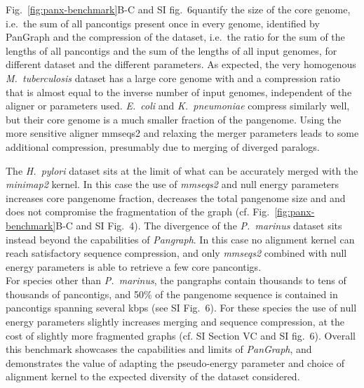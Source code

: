 \documentclass[aps,rmp,preprint,superscriptaddress,10pt,linenumbers]{revtex4-1}
\newcommand{\SIdataBenchmark}{V}
\newcommand{\SIfigBenchmark}{6}
\begin{document}
Fig.~\ref{fig:panx-benchmark}B-C and SI fig.~\SIfigBenchmark quantify the size of the core genome, i.e.~the sum of all pancontigs present once in every genome, identified by PanGraph and the compression of the dataset, i.e.~the ratio for the sum of the lengths of all pancontigs and the sum of the lengths of all input genomes, for different dataset and the different parameters.
As expected, the very homogenous \textit{M.~tuberculosis} dataset has a large core genome with and a compression ratio that is almost equal to the inverse number of input genomes, independent of the aligner or parameters used.
\textit{E.~coli} and \textit{K.~pneumoniae} compress similarly well, but their core genome is a much smaller fraction of the pangenome.
Using the more sensitive aligner mmseqs2 and relaxing the merger parameters leads to some additional compression, presumably due to merging of diverged paralogs.

The \textit{H.~pylori}  dataset sits at the limit of what can be accurately merged with the \textit{minimap2} kernel.
In this case the use of \textit{mmseqs2} and null energy parameters increases core pangenome fraction, decreases the total pangenome size and and does not compromise the fragmentation of the graph (cf. Fig.~\ref{fig:panx-benchmark}B-C and SI Fig.~4).
The divergence of the \textit{P.~marinus} dataset sits instead beyond the capabilities of \textit{Pangraph}. In this case no alignment kernel can reach satisfactory sequence compression, and only \textit{mmseqs2} combined with null energy parameters is able to retrieve a few core pancontigs.\\

For species other than \textit{P.~marinus}, the pangraphs contain thousands to tens of thousands of pancontigs, and 50\% of the pangenome sequence is contained in pancontigs spanning several kbps (see SI Fig.~\SIfigBenchmark).
For these species the use of null energy parameters slightly increases merging and sequence compression, at the cost of slightly more fragmented graphs (cf. SI Section {\SIdataBenchmark}C and SI fig.~\SIfigBenchmark).
Overall this benchmark showcases the capabilities and limits of \textit{PanGraph}, and demonstrates the value of adapting the pseudo-energy parameter and choice of alignment kernel to the expected diversity of the dataset considered.
\end{document}
